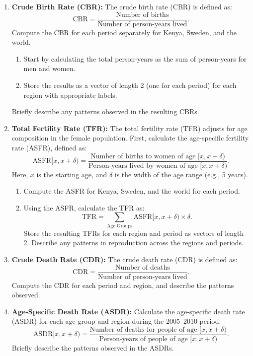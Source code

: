 \documentclass[12pt]{article}
\begin{document}
\begin{enumerate}
    \item \textbf{Crude Birth Rate (CBR):} The crude birth rate (CBR) is defined as:
    \[
    \text{CBR} = \frac{\text{Number of births}}{\text{Number of person-years lived}}.
    \]
    Compute the CBR for each period separately for Kenya, Sweden, and the world. 
    \begin{enumerate}
        \item Start by calculating the total person-years as the sum of person-years for men and women.
        \item Store the results as a vector of length 2 (one for each period) for each region with appropriate labels.
    \end{enumerate}
    Briefly describe any patterns observed in the resulting CBRs.

    \item \textbf{Total Fertility Rate (TFR):} The total fertility rate (TFR) adjusts for age composition in the female population. First, calculate the age-specific fertility rate (ASFR), defined as:
    \[
    \text{ASFR}[x, x+\delta) = \frac{\text{Number of births to women of age } [x, x+\delta)}{\text{Person-years lived by women of age } [x, x+\delta)}.
    \]
    Here, $x$ is the starting age, and $\delta$ is the width of the age range (e.g., 5 years). 
    \begin{enumerate}
        \item Compute the ASFR for Kenya, Sweden, and the world for each period.
        \item Using the ASFR, calculate the TFR as:
        \[
        \text{TFR} = \sum_{\text{Age Groups}} \text{ASFR}[x, x+\delta) \times \delta.
        \]
        Store the resulting TFRs for each region and period as vectors of length 2. Describe any patterns in reproduction across the regions and periods.
    \end{enumerate}

    \item \textbf{Crude Death Rate (CDR):} The crude death rate (CDR) is defined as:
    \[
    \text{CDR} = \frac{\text{Number of deaths}}{\text{Number of person-years lived}}.
    \]
    Compute the CDR for each period and region, and describe the patterns observed.

    \item \textbf{Age-Specific Death Rate (ASDR):} Calculate the age-specific death rate (ASDR) for each age group and region during the 2005–2010 period:
    \[
    \text{ASDR}[x, x+\delta) = \frac{\text{Number of deaths for people of age } [x, x+\delta)}{\text{Person-years of people of age } [x, x+\delta)}.
    \]
    Briefly describe the patterns observed in the ASDRs.


\end{enumerate}
\end{document}
